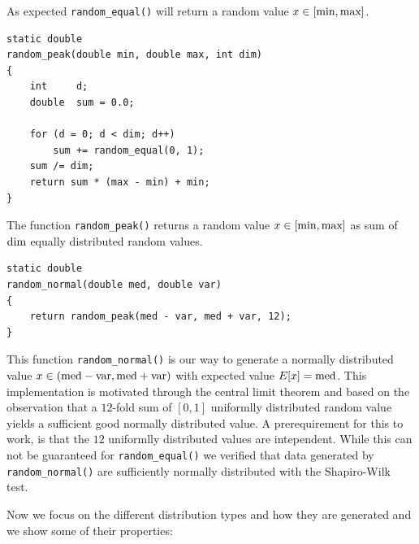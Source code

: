 As expected \lstinline{random_equal()} will return a random value $x
\in [\textnormal{min}, \textnormal{max}]$.

\begin{lstlisting}
static double
random_peak(double min, double max, int dim)
{
	int		d;
	double	sum = 0.0;

	for (d = 0; d < dim; d++)
		sum += random_equal(0, 1);
	sum /= dim;
	return sum * (max - min) + min;
}
\end{lstlisting}

The function \lstinline{random_peak()} returns a random value $x \in
[\textnormal{min}, \textnormal{max}]$ as sum of $\textnormal{dim}$
equally distributed random values.

\begin{lstlisting}
static double
random_normal(double med, double var)
{
	return random_peak(med - var, med + var, 12);
}
\end{lstlisting}

This function \lstinline{random_normal()} is our way to generate a
normally distributed value $x \in (\textnormal{med} -
\textnormal{var}, \textnormal{med} + \textnormal{var})$ with expected
value $E[x] = \textnormal{med}$.
%
This implementation is motivated through the central limit theorem and
based on the observation that a $12$-fold sum of $[0,1]$ uniformlly
distributed random value yields a sufficient good normally distributed
value. A prerequirement for this to work, is that the $12$ uniformlly
distributed values are intependent. While this can not be guaranteed
for \lstinline{random_equal()} we verified that data generated by
\lstinline{random_normal()} are sufficiently normally distributed with
the Shapiro-Wilk test.

Now we focus on the different distribution types and how they are
generated and we show some of their properties:

